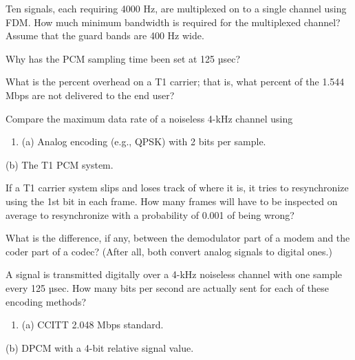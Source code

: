 \documentclass[b5paper,11pt]{memoir}
\begin{document}
{}

Ten signals, each requiring 4000 Hz, are multiplexed on to a single
channel using FDM. How much minimum bandwidth is required for the
multiplexed channel? Assume that the guard bands are 400 Hz wide.

{}

Why has the PCM sampling time been set at 125 µsec?

{}

What is the percent overhead on a T1 carrier; that is, what percent of
the 1.544 Mbps are not delivered to the end user?

{}

Compare the maximum data rate of a noiseless 4-kHz channel using

{}

\begin{enumerate}
\def\labelenumi{\alph{enumi}.}
\item
  {}

  (a) Analog encoding (e.g., QPSK) with 2 bits per sample.
\end{enumerate}

{}

(b) The T1 PCM system.

{}

If a T1 carrier system slips and loses track of where it is, it tries to
resynchronize using the 1st bit in each frame. How many frames will have
to be inspected on average to resynchronize with a probability of 0.001
of being wrong?

{}

What is the difference, if any, between the demodulator part of a modem
and the coder part of a codec? (After all, both convert analog signals
to digital ones.)

{}

A signal is transmitted digitally over a 4-kHz noiseless channel with
one sample every 125 µsec{.} How many bits per second are actually sent
for each of these encoding methods?

{}

\begin{enumerate}
\def\labelenumi{\alph{enumi}.}
\item
  {}

  (a) CCITT 2.048 Mbps standard.
\end{enumerate}

{}

(b) DPCM with a 4-bit relative signal value.

{}
\end{document}
